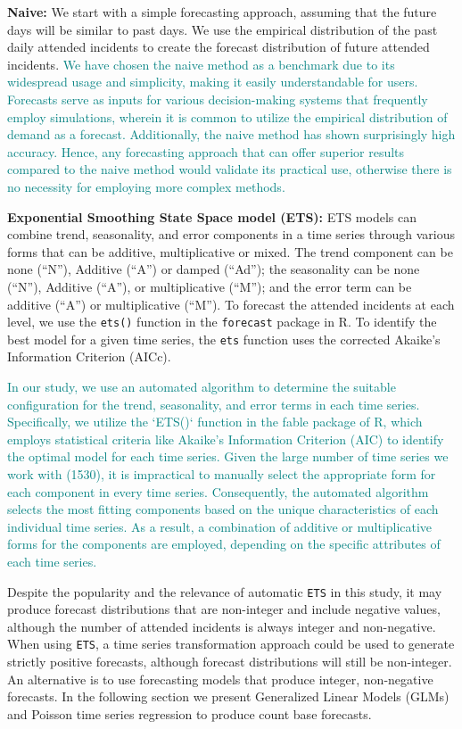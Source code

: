 \documentclass[
  authoryear,
  preprint,
  3p]{elsarticle}
\begin{document}
\textbf{Naive:} We start with a simple forecasting approach, assuming
that the future days will be similar to past days. We use the empirical
distribution of the past daily attended incidents to create the forecast
distribution of future attended incidents.
\textcolor{teal}{We have chosen the naive method as a benchmark due to its widespread usage and simplicity, making it easily understandable for users. Forecasts serve as inputs for various decision-making systems that frequently employ simulations, wherein it is common to utilize the empirical distribution of demand as a forecast. Additionally, the naive method has shown surprisingly high accuracy. Hence, any forecasting approach that can offer superior results compared to the naive method would validate its practical use, otherwise there is no necessity for employing more complex methods.}

\textbf{Exponential Smoothing State Space model (ETS):} ETS models
\citep{hyndman2021forecasting} can combine trend, seasonality, and error
components in a time series through various forms that can be additive,
multiplicative or mixed. The trend component can be none (``N''),
Additive (``A'') or damped (``Ad''); the seasonality can be none
(``N''), Additive (``A''), or multiplicative (``M''); and the error term
can be additive (``A'') or multiplicative (``M''). To forecast the
attended incidents at each level, we use the \texttt{ets()} function in
the \texttt{forecast} package \citep{Rforecast, HK08} in R. To identify
the best model for a given time series, the \texttt{ets} function uses
the corrected Akaike's Information Criterion (AICc).

\textcolor{teal}{In our study, we use an automated algorithm to determine the suitable configuration for the trend, seasonality, and error terms in each time series. Specifically, we utilize the `ETS()` function in the fable package of R, which employs statistical criteria like Akaike's Information Criterion (AIC) to identify the optimal model for each time series. Given the large number of time series we work with (1530), it is impractical to manually select the appropriate form for each component in every time series. Consequently, the automated algorithm selects the most fitting components based on the unique characteristics of each individual time series. As a result, a combination of additive or multiplicative forms for the components are employed, depending on the specific attributes of each time series.}

Despite the popularity and the relevance of automatic \texttt{ETS} in
this study, it may produce forecast distributions that are non-integer
and include negative values, although the number of attended incidents
is always integer and non-negative. When using \texttt{ETS}, a time
series transformation approach could be used to generate strictly
positive forecasts, although forecast distributions will still be
non-integer. An alternative is to use forecasting models that produce
integer, non-negative forecasts. In the following section we present
Generalized Linear Models (GLMs) and Poisson time series regression to
produce count base forecasts.
\end{document}
